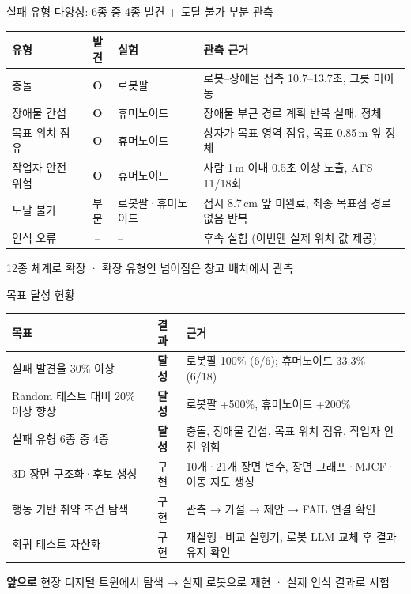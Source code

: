 \documentclass[aspectratio=169,11pt]{beamer}
\begin{document}
\begin{frame}{실패 유형 다양성: 6종 중 4종 발견 + 도달 불가 부분 관측}
\vspace{3mm}
\small
\begin{tabularx}{\textwidth}{@{}p{30mm}cp{28mm}Y@{}}
\toprule
유형 & 발견 & 실험 & 관측 근거 \\
\midrule
충돌 & \textcolor{passc}{\textbf{O}} & 로봇팔 & 로봇–장애물 접촉 10.7--13.7초, 그릇 미이동 \\
장애물 간섭 & \textcolor{passc}{\textbf{O}} & 휴머노이드 & 장애물 부근 경로 계획 반복 실패, 정체 \\
목표 위치 점유 & \textcolor{passc}{\textbf{O}} & 휴머노이드 & 상자가 목표 영역 점유, 목표 0.85\,m 앞 정체 \\
작업자 안전 위험 & \textcolor{passc}{\textbf{O}} & 휴머노이드 & 사람 1\,m 이내 0.5초 이상 노출, AFS 11/18회 \\
도달 불가 & 부분 & 로봇팔·휴머노이드 & 접시 8.7\,cm 앞 미완료, 최종 목표점 경로 없음 반복 \\
인식 오류 & -- & -- & 후속 실험 (이번엔 실제 위치 값 제공) \\
\bottomrule
\end{tabularx}
\vspace{4mm}

{\color{muted} 12종 체계로 확장 · 확장 유형인 넘어짐은 창고 배치에서 관측}
\end{frame}

\begin{frame}{목표 달성 현황}
\vspace{3mm}
\small
\begin{tabularx}{\textwidth}{@{}p{46mm}p{16mm}Y@{}}
\toprule
목표 & 결과 & 근거 \\
\midrule
실패 발견율 30\% 이상 & \textbf{달성} & 로봇팔 100\% (6/6); 휴머노이드 33.3\% (6/18) \\
Random 테스트 대비 20\% 이상 향상 & \textbf{달성} & 로봇팔 +500\%, 휴머노이드 +200\% \\
실패 유형 6종 중 4종 & \textbf{달성} & 충돌, 장애물 간섭, 목표 위치 점유, 작업자 안전 위험 \\
3D 장면 구조화·후보 생성 & 구현 & 10개·21개 장면 변수, 장면 그래프·MJCF·이동 지도 생성 \\
행동 기반 취약 조건 탐색 & 구현 & 관측 → 가설 → 제안 → FAIL 연결 확인 \\
회귀 테스트 자산화 & 구현 & 재실행·비교 실행기, 로봇 LLM 교체 후 결과 유지 확인 \\
\bottomrule
\end{tabularx}
\vspace{4mm}

\textbf{앞으로}\; 현장 디지털 트윈에서 탐색 → 실제 로봇으로 재현 · 실제 인식 결과로 시험
\end{frame}
\end{document}
